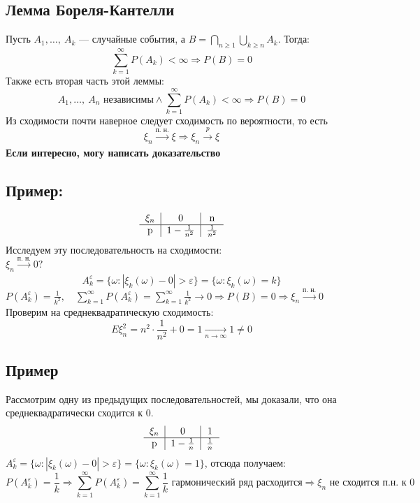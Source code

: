 \documentclass[12pt, a4paper]{article}
\begin{document}
    \subsection*{Лемма Бореля-Кантелли}
    Пусть $A_1,\dots,\ A_k$ --- случайные события, а $B = \bigcap\limits_{n \geq 1} \bigcup\limits_{k \geq n} A_k$. Тогда:
    \[\sum_{k = 1}^{\infty} P(A_k) < \infty \Rightarrow P(B) = 0\]
    Также есть вторая часть этой леммы:
    \[A_1,\dots,\ A_n \text{ независимы}\wedge \sum_{k = 1}^{\infty} P(A_k) < \infty \Rightarrow P(B) = 0\]
    Из сходимости почти наверное следует сходимость по вероятности, то есть
    \[\xi_n\xrightarrow[]{\text{п. н.}} \xi \Rightarrow \xi_n \xrightarrow{p} \xi\]
    \textbf{Если интересно, могу написать доказательство}
    \subsection*{Пример:}
    \[\begin{tabular}{c|c|c}
        $\xi_n$ & 0 & n\\
        \hline
        p & $1 - \frac{1}{n^2}$ & $\frac{1}{n^2}$
    \end{tabular}\]
    Исследуем эту последовательность на сходимости:\\
    $\xi_n\xrightarrow[]{\text{п. н.}} 0?$
    \[A_k^{\varepsilon} = \{\omega: |\xi_k(\omega) - 0| > \varepsilon\} = \{\omega: \xi_k(\omega) = k\}\]
    $P(A_k^{\varepsilon}) = \frac{1}{k^2},\quad \displaystyle \sum_{k = 1}^{\infty} P (A_k^{\varepsilon}) = \sum_{k =1}^{\infty} \frac{1}{k^2} \to 0\Rightarrow P(B) = 0\Rightarrow \xi_n\xrightarrow[]{\text{п. н.}} 0$\\
    Проверим на среднеквадратическую сходимость:
    \[E\xi_n^2 = n^2\cdot \frac{1}{n^2} + 0 = 1\xrightarrow[n\to \infty]{} 1\neq 0\]
    \subsection*{Пример}
    Рассмотрим одну из предыдущих последовательностей, мы доказали, что она среднеквадратически сходится к 0.
    \[\begin{tabular}{c|c|c}
        $\xi_n$ & 0 & 1\\
        \hline
        p & $1 - \frac{1}{n}$ & $\frac{1}{n}$
    \end{tabular}\]
    $A^{\varepsilon}_k = \{\omega: |\xi_k(\omega) - 0| > \varepsilon\} = \{\omega: \xi_k(\omega) = 1\}$, отсюда получаем:
    \[P(A_k^{\varepsilon}) = \frac{1}{k} \Rightarrow \sum_{k = 1}^{\infty} P (A_k^{\varepsilon}) = \sum_{k = 1}^{\infty} \frac{1}{k} \text{ гармонический ряд расходится}\Rightarrow \xi_n \text{ не сходится п.н. к } 0\]
\end{document}
